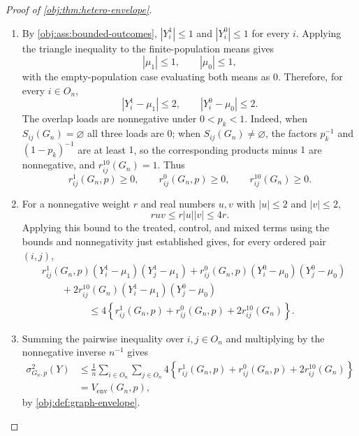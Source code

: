 \documentclass[11pt]{article}
\begin{document}
\begin{proof}[Proof of \cref{obj:thm:hetero-envelope}]
\begin{enumerate}
\item By \cref{obj:ass:bounded-outcomes}, \(|Y_i^1|\le1\) and \(|Y_i^0|\le1\) for every \(i\).  Applying the triangle inequality to the finite-population means gives
\[
|\mu_1|\le1,
\qquad
|\mu_0|\le1,
\]
with the empty-population case evaluating both means as \(0\).  Therefore, for every \(i\in O_n\),
\[
|Y_i^1-\mu_1|\le2,
\qquad
|Y_i^0-\mu_0|\le2.
\]
The overlap loads are nonnegative under \(0<p_k<1\).  Indeed, when \(S_{ij}(G_n)=\varnothing\) all three loads are \(0\); when \(S_{ij}(G_n)\neq\varnothing\), the factors \(p_k^{-1}\) and \((1-p_k)^{-1}\) are at least \(1\), so the corresponding products minus \(1\) are nonnegative, and \(r_{ij}^{10}(G_n)=1\).  Thus
\[
r_{ij}^1(G_n,p)\ge0,
\qquad
r_{ij}^0(G_n,p)\ge0,
\qquad
r_{ij}^{10}(G_n)\ge0.
\]

\item For a nonnegative weight \(r\) and real numbers \(u,v\) with \(|u|\le2\) and \(|v|\le2\),
\[
ruv\le r|u||v|\le4r.
\]
Applying this bound to the treated, control, and mixed terms using the bounds and nonnegativity just established gives, for every ordered pair \((i,j)\),
\[
\begin{aligned}
& r_{ij}^1(G_n,p)(Y_i^1-\mu_1)(Y_j^1-\mu_1)
+r_{ij}^0(G_n,p)(Y_i^0-\mu_0)(Y_j^0-\mu_0)\\
&\qquad{}+2r_{ij}^{10}(G_n)(Y_i^1-\mu_1)(Y_j^0-\mu_0)\\
&\hspace{2cm}\le
4\left\{
r_{ij}^1(G_n,p)+r_{ij}^0(G_n,p)+2r_{ij}^{10}(G_n)
\right\}.
\end{aligned}
\]

\item Summing the pairwise inequality over \(i,j\in O_n\) and multiplying by the nonnegative inverse \(n^{-1}\) gives
\[
\begin{aligned}
\sigma^2_{G_n,p}(Y)
&\le
\frac1n\sum_{i\in O_n}\sum_{j\in O_n}
4\left\{
r_{ij}^1(G_n,p)+r_{ij}^0(G_n,p)+2r_{ij}^{10}(G_n)
\right\}\\
&=V_{\mathrm{env}}(G_n,p),
\end{aligned}
\]
by \cref{obj:def:graph-envelope}.
\end{enumerate}
\end{proof}
\end{document}

